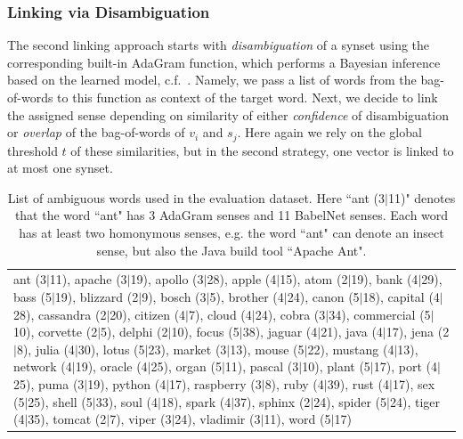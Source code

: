 \documentclass[10pt, a4paper]{article}
\begin{document}
\subsubsection{Linking via Disambiguation}
The second linking approach starts with \textit{disambiguation} of a synset using the corresponding built-in AdaGram function, which performs a Bayesian inference based on the learned model, c.f.~\cite{bartunov2015breaking}. Namely, we pass a list of words from the bag-of-words to this function as context of the target word. 
Next, we decide to link the assigned sense depending on similarity of either \textit{confidence} of disambiguation or \textit{overlap} of the bag-of-words of $v_i$ and $s_j$. Here again we rely on the global threshold $t$ of these similarities, but in the second strategy, one vector is linked to at most one synset. 

\begin{table}

\footnotesize 
\begin{center}
\begin{tabular}{l}



\parbox{17cm}{
ant (3$\vert$11),  apache (3$\vert$19),  apollo (3$\vert$28),  apple (4$\vert$15),  atom (2$\vert$19),  bank (4$\vert$29),  bass (5$\vert$19),  blizzard (2$\vert$9),  bosch (3$\vert$5),  brother (4$\vert$24),  canon (5$\vert$18),  capital (4$\vert$28),  cassandra (2$\vert$20),  citizen (4$\vert$7),  cloud (4$\vert$24),  cobra (3$\vert$34),  commercial (5$\vert$10),  corvette (2$\vert$5),  delphi (2$\vert$10),  focus (5$\vert$38),  jaguar (4$\vert$21),  java (4$\vert$17),  jena (2$\vert$8),  julia (4$\vert$30),  lotus (5$\vert$23),  market (3$\vert$13),  mouse (5$\vert$22),  mustang (4$\vert$13),  network (4$\vert$19),  oracle (4$\vert$25),  organ (5$\vert$11),  pascal (3$\vert$10),  plant (5$\vert$17),  port (4$\vert$25),  puma (3$\vert$19),  python (4$\vert$17),  raspberry (3$\vert$8),  ruby (4$\vert$39),  rust (4$\vert$17),  sex (5$\vert$25),  shell (5$\vert$33),  soul (4$\vert$18),  spark (4$\vert$37),  sphinx (2$\vert$24),  spider (5$\vert$24),  tiger (4$\vert$35),  tomcat (2$\vert$7),  viper (3$\vert$24),  vladimir (3$\vert$11),  word (5$\vert$17)}

\end{tabular}
\end{center}
\caption{ List of ambiguous words used in the evaluation dataset. Here ``ant (3$\vert$11)" denotes that the word ``ant" has 3 AdaGram senses and 11 BabelNet senses. Each word has at least two homonymous senses, e.g. the word ``ant" can denote an insect sense, but also the Java build tool ``Apache Ant".  }
\label{tbl:evaluation}
\end{table}
\end{document}
